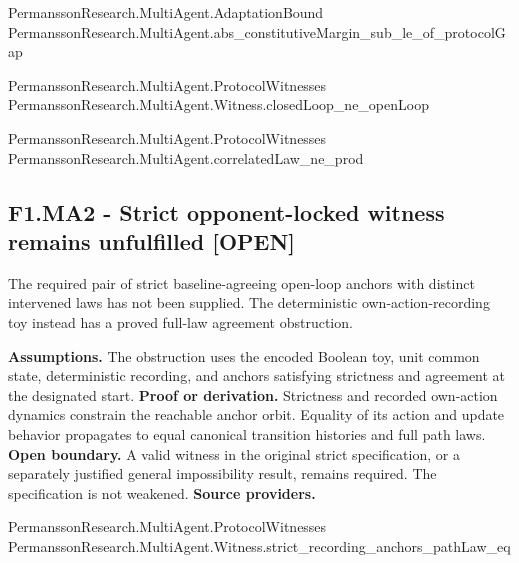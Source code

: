 \documentclass[11pt,a4paper]{article}
\begin{document}
{\footnotesize\raggedright PermanssonRe\allowbreak{}search.Multi\allowbreak{}Agent.Adapta\allowbreak{}tionBound\\ PermanssonRe\allowbreak{}search.Multi\allowbreak{}Agent.abs\_co\allowbreak{}nstitutiveMa\allowbreak{}rgin\_sub\_le\_\allowbreak{}of\_protocolG\allowbreak{}ap\par}
{\footnotesize\raggedright PermanssonRe\allowbreak{}search.Multi\allowbreak{}Agent.Protoc\allowbreak{}olWitnesses\\ PermanssonRe\allowbreak{}search.Multi\allowbreak{}Agent.Witnes\allowbreak{}s.closedLoop\allowbreak{}\_ne\_openLoop\par}
{\footnotesize\raggedright PermanssonRe\allowbreak{}search.Multi\allowbreak{}Agent.Protoc\allowbreak{}olWitnesses\\ PermanssonRe\allowbreak{}search.Multi\allowbreak{}Agent.correl\allowbreak{}atedLaw\_ne\_p\allowbreak{}rod\par}
\subsection*{F1.MA2 - Strict opponent-locked witness remains unfulfilled [OPEN]}
The required pair of strict baseline-agreeing open-loop anchors with distinct intervened laws has not been supplied. The deterministic own-action-recording toy instead has a proved full-law agreement obstruction.

\textbf{Assumptions.} The obstruction uses the encoded Boolean toy, unit common state, deterministic recording, and anchors satisfying strictness and agreement at the designated start.
\textbf{Proof or derivation.} Strictness and recorded own-action dynamics constrain the reachable anchor orbit. Equality of its action and update behavior propagates to equal canonical transition histories and full path laws.
\textbf{Open boundary.} A valid witness in the original strict specification, or a separately justified general impossibility result, remains required. The specification is not weakened.
\textbf{Source providers.}
{\footnotesize\raggedright PermanssonRe\allowbreak{}search.Multi\allowbreak{}Agent.Protoc\allowbreak{}olWitnesses\\ PermanssonRe\allowbreak{}search.Multi\allowbreak{}Agent.Witnes\allowbreak{}s.strict\_rec\allowbreak{}ording\_ancho\allowbreak{}rs\_pathLaw\_e\allowbreak{}q\par}
\end{document}
